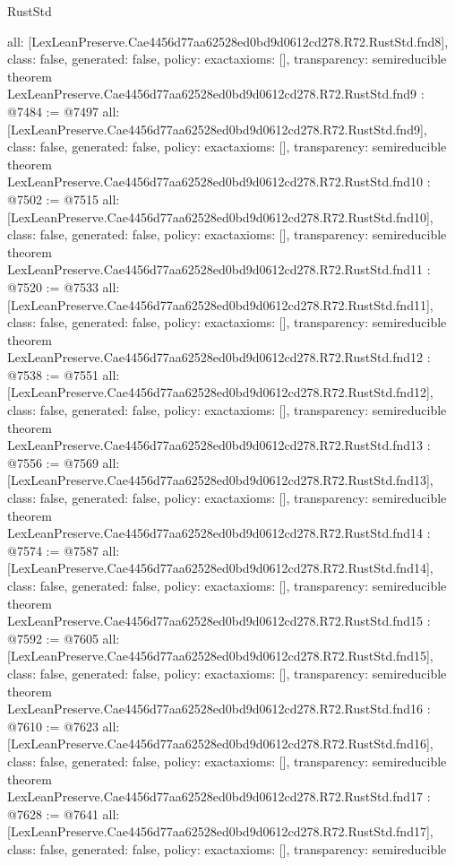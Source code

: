 \begin{lexlean}{RustStd}
\begin{coremodule}
{  all: [LexLeanPreserve.Cae4456d77aa62528ed0bd9d0612cd278.R72.RustStd.fnd8],
  class: false,
  generated: false,
  policy: exact{axioms: []},
  transparency: semireducible
}
theorem LexLeanPreserve.Cae4456d77aa62528ed0bd9d0612cd278.R72.RustStd.fnd9 : @7484 := @7497 {
  all: [LexLeanPreserve.Cae4456d77aa62528ed0bd9d0612cd278.R72.RustStd.fnd9],
  class: false,
  generated: false,
  policy: exact{axioms: []},
  transparency: semireducible
}
theorem LexLeanPreserve.Cae4456d77aa62528ed0bd9d0612cd278.R72.RustStd.fnd10 : @7502 := @7515 {
  all: [LexLeanPreserve.Cae4456d77aa62528ed0bd9d0612cd278.R72.RustStd.fnd10],
  class: false,
  generated: false,
  policy: exact{axioms: []},
  transparency: semireducible
}
theorem LexLeanPreserve.Cae4456d77aa62528ed0bd9d0612cd278.R72.RustStd.fnd11 : @7520 := @7533 {
  all: [LexLeanPreserve.Cae4456d77aa62528ed0bd9d0612cd278.R72.RustStd.fnd11],
  class: false,
  generated: false,
  policy: exact{axioms: []},
  transparency: semireducible
}
theorem LexLeanPreserve.Cae4456d77aa62528ed0bd9d0612cd278.R72.RustStd.fnd12 : @7538 := @7551 {
  all: [LexLeanPreserve.Cae4456d77aa62528ed0bd9d0612cd278.R72.RustStd.fnd12],
  class: false,
  generated: false,
  policy: exact{axioms: []},
  transparency: semireducible
}
theorem LexLeanPreserve.Cae4456d77aa62528ed0bd9d0612cd278.R72.RustStd.fnd13 : @7556 := @7569 {
  all: [LexLeanPreserve.Cae4456d77aa62528ed0bd9d0612cd278.R72.RustStd.fnd13],
  class: false,
  generated: false,
  policy: exact{axioms: []},
  transparency: semireducible
}
theorem LexLeanPreserve.Cae4456d77aa62528ed0bd9d0612cd278.R72.RustStd.fnd14 : @7574 := @7587 {
  all: [LexLeanPreserve.Cae4456d77aa62528ed0bd9d0612cd278.R72.RustStd.fnd14],
  class: false,
  generated: false,
  policy: exact{axioms: []},
  transparency: semireducible
}
theorem LexLeanPreserve.Cae4456d77aa62528ed0bd9d0612cd278.R72.RustStd.fnd15 : @7592 := @7605 {
  all: [LexLeanPreserve.Cae4456d77aa62528ed0bd9d0612cd278.R72.RustStd.fnd15],
  class: false,
  generated: false,
  policy: exact{axioms: []},
  transparency: semireducible
}
theorem LexLeanPreserve.Cae4456d77aa62528ed0bd9d0612cd278.R72.RustStd.fnd16 : @7610 := @7623 {
  all: [LexLeanPreserve.Cae4456d77aa62528ed0bd9d0612cd278.R72.RustStd.fnd16],
  class: false,
  generated: false,
  policy: exact{axioms: []},
  transparency: semireducible
}
theorem LexLeanPreserve.Cae4456d77aa62528ed0bd9d0612cd278.R72.RustStd.fnd17 : @7628 := @7641 {
  all: [LexLeanPreserve.Cae4456d77aa62528ed0bd9d0612cd278.R72.RustStd.fnd17],
  class: false,
  generated: false,
  policy: exact{axioms: []},
  transparency: semireducible
}
\end{coremodule}
\end{lexlean}
